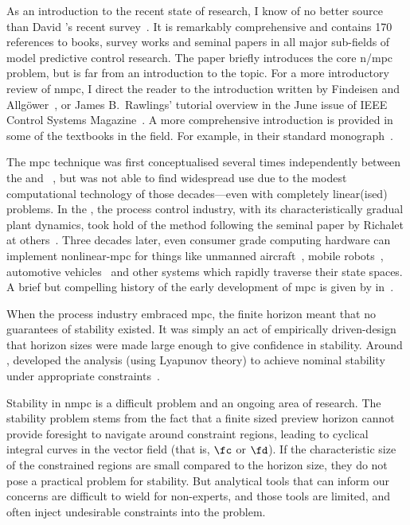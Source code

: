 As an introduction to the recent state of research, I know of no better source
than David \citeauthor{Mayne2014}'s recent survey~\cite{Mayne2014}. It is
remarkably comprehensive and contains 170 references to books, survey works and
seminal papers in all major sub-fields of model predictive control research. The
paper briefly introduces the core \ac{n/mpc} problem, but is far from an
introduction to the topic. For a more introductory review of \ac{nmpc}, I direct
the reader to the introduction written by Findeisen and
Allgöwer~\cite{Findeisen2002}, or James B.\ Rawlings' tutorial overview in the
June  issue of IEEE Control Systems Magazine~\cite{Rawlings2000}. A
more comprehensive introduction is provided in some of the textbooks in the
field. For example, \citeauthor{Grune2011} in their standard
monograph~\cite{Grune2011}.

The \ac{mpc} technique was first conceptualised several times independently
between the  and ~\cite{Grune2011,Camacho2007}, but
was not able to find widespread use due to the modest computational technology
of those decades—even with completely linear(ised) problems. In the
, the process control industry, with its characteristically gradual
plant dynamics, took hold of the method following the seminal paper by Richalet
at others~\cite{Richalet1978}. Three decades later, even consumer grade
computing hardware can implement nonlinear-\ac{mpc} for things like unmanned
aircraft~\cite{Eklund2005}, mobile robots~\cite{Teatro2014}, automotive
vehicles~\cite{Abbas2011} and other systems which rapidly traverse their state
spaces. A brief but compelling history of the early development of \ac{mpc} is
given by \citeauthor{Camacho2007} in~\cite{Camacho2007}.

When the process industry embraced \ac{mpc}, the finite horizon meant that no
guarantees of stability existed. It was simply an act of empirically
driven-design that horizon sizes were made large enough to give confidence in
stability. Around , \citeauthor{Mayne2000} developed the analysis
(using Lyapunov theory) to achieve nominal stability under appropriate
constraints~\cite{Mayne2000}.

Stability in \ac{nmpc} is a difficult problem and an ongoing area of research.
The stability problem stems from the fact that a finite sized preview horizon
cannot provide foresight to navigate around constraint regions, leading to
cyclical integral curves in the vector field (that is, $\fc$ or $\fd$). If the
characteristic size of the constrained regions are small compared to the horizon
size, they do not pose a practical problem for stability. But analytical tools
that can inform our concerns are difficult to wield for non-experts, and those
tools are limited, and often inject undesirable constraints into the problem.

